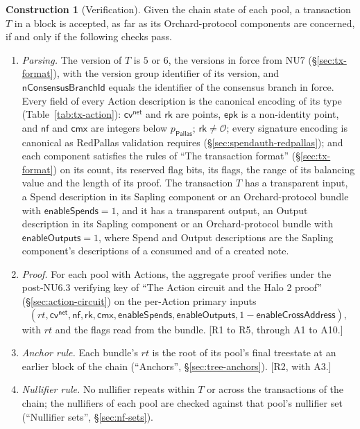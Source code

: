 \documentclass[11pt,a4paper]{article}
\theoremstyle{definition}
\newtheorem{construction}[theorem]{Construction}
\newcommand{\nfsym}{\mathsf{nf}}
\newcommand{\cmx}{\mathsf{cmx}}
\newcommand{\cvsym}{\mathsf{cv}}
\newcommand{\rk}{\mathsf{rk}}
\newcommand{\Pallas}{\ensuremath{\mathsf{Pallas}}}
\begin{document}
\begin{construction}[Verification]
Given the chain state of each pool, a transaction $T$ in a block is
accepted, as far as its Orchard-protocol components are concerned, if and
only if the following checks pass.
\begin{enumerate}[label=(\arabic*)]
\item \emph{Parsing.} The version of $T$ is $5$ or $6$, the versions in
  force from NU7 (\S\ref{sec:tx-format}), with the version group identifier
  of its version, and $\mathsf{nConsensusBranchId}$ equals
  the identifier of the consensus branch in force. Every field of every
  Action description is the canonical encoding of its type
  (Table~\ref{tab:tx-action}): $\cvsym^{\mathsf{net}}$ and $\rk$ are
  points, $\mathsf{epk}$ is a non-identity point, and $\nfsym$ and $\cmx$
  are integers below $p_{\Pallas}$; $\rk \neq \mathcal{O}$; every signature
  encoding is canonical as RedPallas validation requires
  (\S\ref{sec:spendauth-redpallas}); and each component satisfies the rules
  of ``The transaction format'' (\S\ref{sec:tx-format}) on its count, its
  reserved flag bits, its flags, the range of its balancing value and the
  length of its proof. The transaction $T$ has a transparent input, a Spend
  description in its Sapling component or an Orchard-protocol bundle with
  $\mathsf{enableSpends} = 1$, and it has a transparent output, an Output
  description in its Sapling component or an Orchard-protocol bundle with
  $\mathsf{enableOutputs} = 1$, where Spend and Output descriptions are the
  Sapling component's descriptions of a consumed and of a created note.
\item \emph{Proof.} For each pool with Actions, the aggregate proof verifies
  under the post-NU6.3 verifying key of ``The Action circuit and the Halo 2
  proof'' (\S\ref{sec:action-circuit}) on the per-Action primary inputs
  \[
    (\mathit{rt}, \cvsym^{\mathsf{net}}, \nfsym, \rk, \cmx,
    \mathsf{enableSpends}, \mathsf{enableOutputs},
    1 - \mathsf{enableCrossAddress}),
  \]
  with $\mathit{rt}$ and the flags read from the bundle. [R1 to R5, through
  A1 to A10.]
\item \emph{Anchor rule.} Each bundle's $\mathit{rt}$ is the root of its
  pool's final treestate at an earlier block of the chain (``Anchors'',
  \S\ref{sec:tree-anchors}). [R2, with A3.]
\item \emph{Nullifier rule.} No nullifier repeats within $T$ or across the
  transactions of the chain; the nullifiers of each pool are checked against
  that pool's nullifier set (``Nullifier sets'', \S\ref{sec:nf-sets}).

\end{enumerate}
\end{construction}
\end{document}
